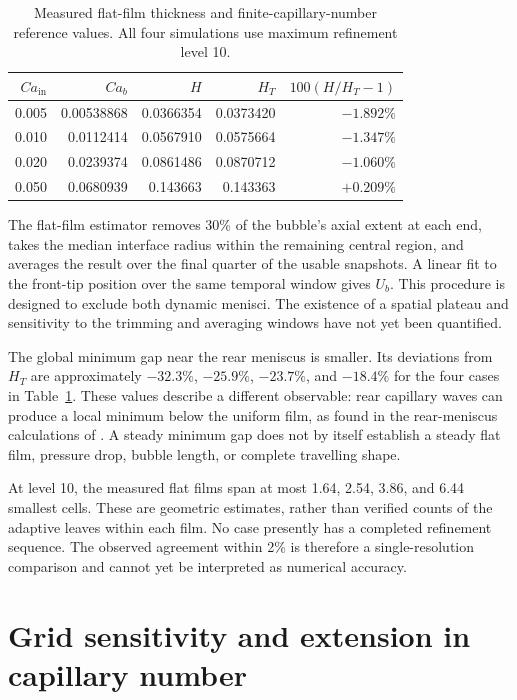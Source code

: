 \documentclass[11pt,a4paper]{article}
\begin{document}
\begin{table}[t]
  \centering
  \caption{Measured flat-film thickness and finite-capillary-number reference
  values. All four simulations use maximum refinement level 10.}
  \label{tab:baseline}
  \begin{tabular}{rrrrr}
    \toprule
    $Ca_{\mathrm{in}}$ & $Ca_b$ & $H$ & $H_T$ & $100(H/H_T-1)$ \\
    \midrule
    0.005 & 0.00538868 & 0.0366354 & 0.0373420 & $-1.892\%$ \\
    0.010 & 0.0112414  & 0.0567910 & 0.0575664 & $-1.347\%$ \\
    0.020 & 0.0239374  & 0.0861486 & 0.0870712 & $-1.060\%$ \\
    0.050 & 0.0680939  & 0.143663  & 0.143363  & $+0.209\%$ \\
    \bottomrule
  \end{tabular}
\end{table}

The flat-film estimator removes 30\% of the bubble's axial extent at each end,
takes the median interface radius within the remaining central region, and
averages the result over the final quarter of the usable snapshots. A linear
fit to the front-tip position over the same temporal window gives $U_b$. This
procedure is designed to exclude both dynamic menisci. The existence of a
spatial plateau and sensitivity to the trimming and averaging windows have not
yet been quantified.

The global minimum gap near the rear meniscus is smaller. Its deviations from
$H_T$ are approximately $-32.3\%$, $-25.9\%$, $-23.7\%$, and $-18.4\%$ for
the four cases in Table~\ref{tab:baseline}. These values describe a different
observable: rear capillary waves can produce a local minimum below the
uniform film, as found in the rear-meniscus calculations of
\citet{giavedoni1999rear}. A steady minimum gap does not by itself establish a
steady flat film, pressure drop, bubble length, or complete travelling shape.

At level 10, the measured flat films span at most 1.64, 2.54, 3.86, and 6.44
smallest cells. These are geometric estimates, rather than verified counts of
the adaptive leaves within each film. No case presently has a completed
refinement sequence. The observed agreement within 2\% is therefore a
single-resolution comparison and cannot yet be interpreted as numerical
accuracy.

\section{Grid sensitivity and extension in capillary number}
\end{document}
